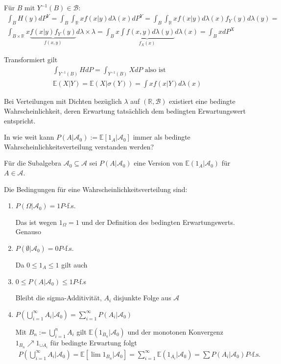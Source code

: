 \documentclass[]{article}
\begin{document}
Für $B$ mit $Y^{-1}(B) \in \mathcal{B}$:
\begin{align*}
	\int_B H(y) dP^Y = \int_B \int_\mathbb{R} x f(x|y) d\lambda(x) dP^Y = \int_B \int_\mathbb{R} x f(x|y) d\lambda(x) f_Y(y) d\lambda(y) = \\
	\int_{B\times\mathbb{R}} x \underbrace{f(x|y)f_Y(y)}_{f(x,y)} d\lambda\times\lambda = \int_B x \underbrace{\int f(x,y) d\lambda(y)}_{f_X(x)} d\lambda(x) = \int_B x dP^X
\end{align*}

Transformiert gilt
\begin{align*}
	\int_{Y^{-1}(B)} H dP = \int_{Y^{-1}(B)} X dP \text{ also ist}\\
	\mathbb{E}(X|Y) = \mathbb{E}(X|\sigma(Y)) = \int xf(x|Y) d\lambda(x)
\end{align*}

Bei Verteilungen mit Dichten bezüglich $\lambda$ auf $(\mathbb{R}, \mathcal{B})$ existiert eine bedingte Wahrscheinlichkeit, deren Erwartung tatsächlich dem bedingten Erwartungswert entspricht.

In wie weit kann $P(A|\mathcal{A}_0):=\mathbb{E}[1_A|\mathcal{A}_0]$ immer als bedingte Wahrscheinlichkeitsverteilung verstanden werden?

Für die Subalgebra $\mathcal{A}_0 \subseteq \mathcal{A}$ sei $P(A|\mathcal{A}_0)$ eine Version von $\mathbb{E}(1_A|\mathcal{A}_0)$ für $A\in \mathcal{A}$.

Die Bedingungen für eine Wahrscheinlichkeitsverteilung sind:
\begin{enumerate}
	\item $P(\Omega|\mathcal{A}_0) = 1 P$-f.s.
	
	Das ist wegen $1_\Omega = 1$ und der Definition des bedingten Erwartungswerts. Genauso
	\item $P(\emptyset|\mathcal{A}_0) = 0 P$-f.s.
	
	Da $0\leq 1_A \leq 1$ gilt auch
	\item $0 \leq P(A|\mathcal{A}_0) \leq 1 P$-f.s
	
	Bleibt die sigma-Additivität, $A_i$ disjunkte Folge aus $\mathcal{A}$
	\item $P(\bigcup_{i=1}^\infty A_i |\mathcal{A}_0) = \sum_{i=1}^{\infty} P(A_i|\mathcal{A}_0)$
	
	Mit $B_n:= \bigcup_{i=1}^n A_i$ gilt $\mathbb{E}(1_{B_n}|\mathcal{A}_0)$ und der monotonen Konvergenz $1_{B_n}\nearrow 1_{\cup A_i}$ für bedingte Erwartung folgt
	\begin{align*}
		P(\bigcup_{i=1}^\infty A_i | \mathcal{A}_0) = \mathbb{E}[\lim 1_{B_n} | \mathcal{A}_0] = \sum_{i=1}^\infty \mathbb{E}(1_{A_i}|\mathcal{A}_0) = \sum P(A_i | \mathcal{A}_0) P\text{-f.s.}
	\end{align*}
\end{enumerate}
\end{document}
